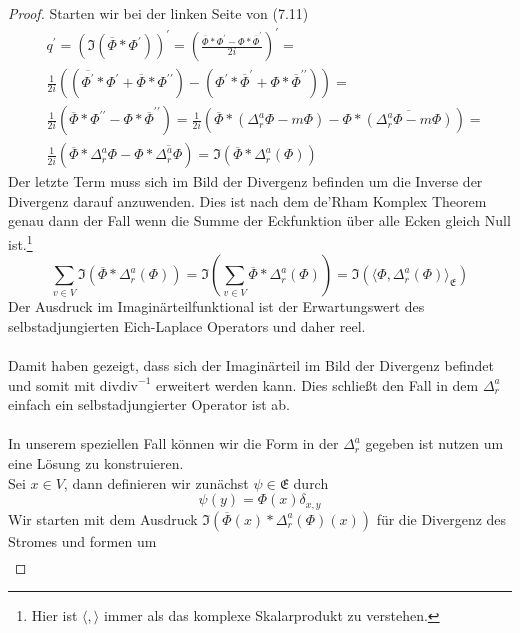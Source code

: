 \documentclass[11pt,a4paper,leqno]{report}
\numberwithin{equation}{chapter}
\begin{document}
\begin{proof}
Starten wir bei der linken Seite von (7.11)
\begin{align*}
	&q^\prime = (\Im(\overline{\Phi}*\Phi^\prime))^\prime=(\frac{\overline{\Phi}*\Phi^\prime - \Phi*\overline{\Phi}^\prime}{2i})^\prime=\\
	&\frac{1}{2i}((\overline{\Phi^\prime}*\Phi^\prime + \overline{\Phi}*\Phi^{\prime\prime})-(\Phi^\prime*\overline{\Phi}^\prime+\Phi*\overline{\Phi}^{\prime\prime}))=\\
	&\frac{1}{2i}(\overline{\Phi}*\Phi^{\prime\prime}-\Phi*\overline{\Phi}^{\prime\prime})=
	\frac{1}{2i}(\overline{\Phi}*(\Delta^a_r\Phi - m \Phi)-\Phi*\overline{(\Delta^a_r\Phi - m \Phi)})=\\
	&\frac{1}{2i}(\overline{\Phi}*\Delta^a_r\Phi-\Phi*\overline{\Delta^a_r\Phi})=\Im(\overline{\Phi}*\Delta^a_r(\Phi))
\end{align*}
Der letzte Term muss sich im Bild der Divergenz befinden um die Inverse der Divergenz darauf anzuwenden. Dies ist nach dem de'Rham Komplex Theorem genau dann der Fall wenn die Summe der Eckfunktion \"uber alle Ecken gleich Null ist.\footnote{Hier ist $\langle, \rangle$ immer als das komplexe Skalarprodukt zu verstehen.}
\begin{equation*}
	\sum_{v\in V}\Im(\overline{\Phi}*\Delta^a_r(\Phi))=\Im(\sum_{v\in V}\overline{\Phi}*\Delta^a_r(\Phi))=\Im(\langle\Phi, \Delta^a_r(\Phi)\rangle_{\mathfrak{E}})
\end{equation*}
Der Ausdruck im Imagin\"arteilfunktional ist der Erwartungswert des selbstadjungierten Eich-Laplace Operators und daher reel.\\
\\
Damit haben gezeigt, dass sich der Imagin\"arteil im Bild der Divergenz befindet und somit mit $\text{div}\text{div}^{-1}$ erweitert werden kann.
Dies schlie\ss{}t den Fall in dem  $\Delta^a_r$ einfach ein selbstadjungierter Operator ist ab.\\
\\
In unserem speziellen Fall k\"onnen wir die Form in der $\Delta^a_r$ gegeben ist nutzen um eine L\"osung zu konstruieren.
\\
Sei $x\in V$, dann definieren wir zun\"achst $\psi\in\mathfrak{E}$ durch 
\begin{equation*}
	\psi(y) = \Phi(x)\delta_{x,y}
\end{equation*}
Wir starten mit dem Ausdruck $\Im(\overline{\Phi}(x)*\Delta^a_r(\Phi)(x))$ f\"ur die Divergenz des Stromes und formen um
\begin{align*}

\end{align*}
\end{proof}
\end{document}
